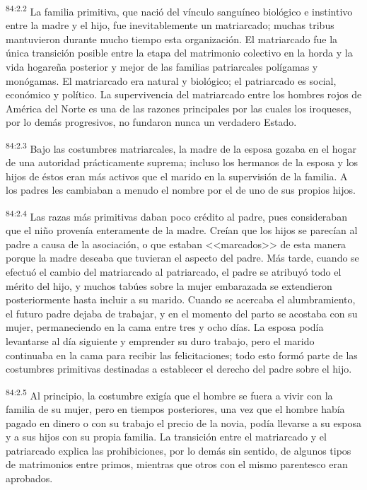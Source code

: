 \par
\textsuperscript{84:2.2} La familia primitiva, que nació del vínculo sanguíneo biológico e instintivo entre la madre y el hijo, fue inevitablemente un matriarcado; muchas tribus mantuvieron durante mucho tiempo esta organización. El matriarcado fue la única transición posible entre la etapa del matrimonio colectivo en la horda y la vida hogareña posterior y mejor de las familias patriarcales polígamas y monógamas. El matriarcado era natural y biológico; el patriarcado es social, económico y político. La supervivencia del matriarcado entre los hombres rojos de América del Norte es una de las razones principales por las cuales los iroqueses, por lo demás progresivos, no fundaron nunca un verdadero Estado.

\par
\textsuperscript{84:2.3} Bajo las costumbres matriarcales, la madre de la esposa gozaba en el hogar de una autoridad prácticamente suprema; incluso los hermanos de la esposa y los hijos de éstos eran más activos que el marido en la supervisión de la familia. A los padres les cambiaban a menudo el nombre por el de uno de sus propios hijos.

\par
\textsuperscript{84:2.4} Las razas más primitivas daban poco crédito al padre, pues consideraban que el niño provenía enteramente de la madre. Creían que los hijos se parecían al padre a causa de la asociación, o que estaban <<marcados>> de esta manera porque la madre deseaba que tuvieran el aspecto del padre. Más tarde, cuando se efectuó el cambio del matriarcado al patriarcado, el padre se atribuyó todo el mérito del hijo, y muchos tabúes sobre la mujer embarazada se extendieron posteriormente hasta incluir a su marido. Cuando se acercaba el alumbramiento, el futuro padre dejaba de trabajar, y en el momento del parto se acostaba con su mujer, permaneciendo en la cama entre tres y ocho días. La esposa podía levantarse al día siguiente y emprender su duro trabajo, pero el marido continuaba en la cama para recibir las felicitaciones; todo esto formó parte de las costumbres primitivas destinadas a establecer el derecho del padre sobre el hijo.

\par
\textsuperscript{84:2.5} Al principio, la costumbre exigía que el hombre se fuera a vivir con la familia de su mujer, pero en tiempos posteriores, una vez que el hombre había pagado en dinero o con su trabajo el precio de la novia, podía llevarse a su esposa y a sus hijos con su propia familia. La transición entre el matriarcado y el patriarcado explica las prohibiciones, por lo demás sin sentido, de algunos tipos de matrimonios entre primos, mientras que otros con el mismo parentesco eran aprobados.

